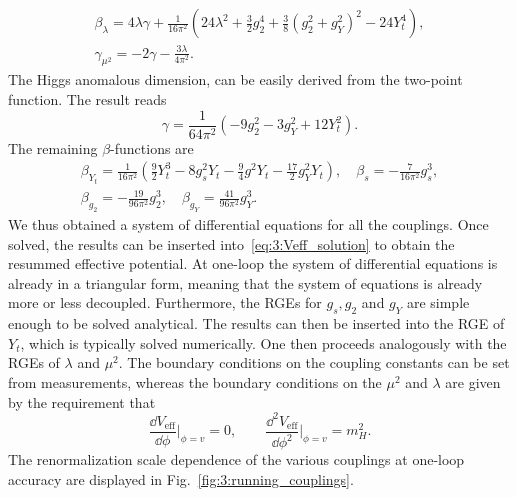 \begin{equation}
\begin{gathered}
\beta_\lambda = 4 \lambda \gamma + \frac{1}{16 \pi^2} (24 \lambda^2 + \frac{3}{2} g_2^4 + \frac{3}{8} (g_2^2 + g_Y^2)^2 - 24 Y_t^4), \\
\gamma_{\mu^2} = - 2 \gamma - \frac{3 \lambda}{4 \pi^2}.
\end{gathered}
\label{eq:3:beta_lambda_and_gamma_mu2}
\end{equation}
The Higgs anomalous dimension, can be easily derived from the two-point function. The result reads
\begin{equation}
\gamma = \frac{1}{64 \pi^2} \left( -9 g_2^2 - 3 g_Y^2 + 12 Y_t^2 \right).
\end{equation}
The remaining $\beta$-functions are
\begin{equation}
\begin{gathered}
\beta_{Y_t} = \frac{1}{16 \pi^2} \left(\frac{9}{2} Y_t^3 - 8 g_s^2 Y_t - \frac{9}{4} g^2 Y_t - \frac{17}{2} g_Y^2 Y_t \right), \quad \beta_s = - \frac{7}{16 \pi^2} g_s^3, \\
\beta_{g_2} = - \frac{19}{96 \pi^2} g_2^3, \quad \beta_{g_Y} = \frac{41}{96 \pi^2} g_Y^3.
\end{gathered}
\end{equation}
We thus obtained a system of differential equations for all the couplings. Once solved, the results can be inserted into~\eqref{eq:3:Veff_solution} to obtain the resummed effective potential. At one-loop the system of differential equations is already in a triangular form, meaning that the system of equations is already more or less decoupled. Furthermore, the \acs{RGE}s for $g_s, g_2$ and $g_Y$ are simple enough to be solved analytical. The results can then be inserted into the \acs{RGE} of $Y_t$, which is typically solved numerically. One then proceeds analogously with the \acs{RGE}s of $\lambda$ and $\mu^2$. The boundary conditions on the coupling constants can be set from measurements, whereas the boundary conditions on the $\mu^2$ and $\lambda$ are given by the requirement that
\begin{equation}
\frac{\dd V_{\text{eff}}}{\dd \phi}\bigg \vert_{\phi = v} = 0, \qquad \frac{\dd^2 V_\text{eff}}{\dd \phi^2} \bigg \vert_{\phi = v} = m_H^2.
\end{equation}
The renormalization scale dependence of the various couplings at one-loop accuracy are displayed in Fig.~\ref{fig:3:running_couplings}.

